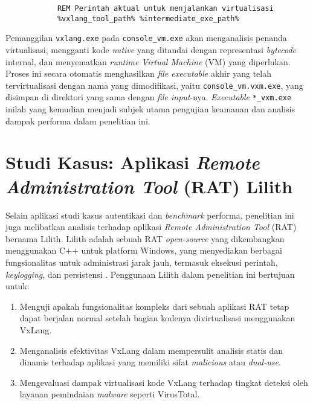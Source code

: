 \begin{enumerate}
\begin{itemize}
\begin{listing}[H]
\begin{verbatim}
            REM Perintah aktual untuk menjalankan virtualisasi
            %vxlang_tool_path% %intermediate_exe_path%
            \end{verbatim}
            \label{lst:virtualize_bat_example_bab4}
            \end{listing}
        Pemanggilan \texttt{vxlang.exe} pada \texttt{console\_vm.exe} akan menganalisis penanda virtualisasi, mengganti kode \textit{native} yang ditandai dengan representasi \textit{bytecode} internal, dan menyematkan \textit{runtime Virtual Machine} (VM) yang diperlukan. Proses ini secara otomatis menghasilkan \textit{file executable} akhir yang telah tervirtualisasi dengan nama yang dimodifikasi, yaitu \texttt{console\_vm.vxm.exe}, yang disimpan di direktori yang sama dengan \textit{file input}-nya. \textit{Executable} \texttt{*\_vxm.exe} inilah yang kemudian menjadi subjek utama pengujian keamanan dan analisis dampak performa dalam penelitian ini.
    \end{itemize}
\end{enumerate}

\section{Studi Kasus: Aplikasi \textit{Remote Administration Tool} (RAT) Lilith}
\label{sec:implementasi_lilith}
Selain aplikasi studi kasus autentikasi dan \textit{benchmark} performa, penelitian ini juga melibatkan analisis terhadap aplikasi \textit{Remote Administration Tool} (RAT) bernama Lilith. Lilith adalah sebuah RAT \textit{open-source} yang dikembangkan menggunakan C++ untuk platform Windows, yang menyediakan berbagai fungsionalitas untuk administrasi jarak jauh, termasuk eksekusi perintah, \textit{keylogging}, dan persistensi \cite{LilithRAT}. Penggunaan Lilith dalam penelitian ini bertujuan untuk:
\begin{enumerate}
    \item Menguji apakah fungsionalitas kompleks dari sebuah aplikasi RAT tetap dapat berjalan normal setelah bagian kodenya divirtualisasi menggunakan VxLang.
    \item Menganalisis efektivitas VxLang dalam mempersulit analisis statis dan dinamis terhadap aplikasi yang memiliki sifat \textit{malicious} atau \textit{dual-use}.
    \item Mengevaluasi dampak virtualisasi kode VxLang terhadap tingkat deteksi oleh layanan pemindaian \textit{malware} seperti VirusTotal.
\end{enumerate}

